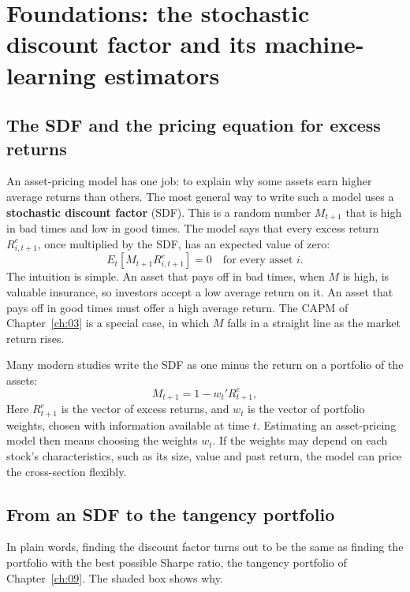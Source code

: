 \section{Foundations: the stochastic discount factor and its machine-learning estimators}
\label{sec:22-foundations}

\subsection{The SDF and the pricing equation for excess returns}

An asset-pricing model has one job: to explain why some assets earn higher average returns than others. The most general way to write such a model uses a \textbf{stochastic discount factor} (SDF). This is a random number $M_{t+1}$ that is high in bad times and low in good times. The model says that every excess return $R^e_{i,t+1}$, once multiplied by the SDF, has an expected value of zero:
\begin{equation}
  E_t\!\left[ M_{t+1} R^e_{i,t+1} \right] = 0 \quad \text{for every asset } i.
  \label{eq:22-pricing}
\end{equation}
The intuition is simple. An asset that pays off in bad times, when $M$ is high, is valuable insurance, so investors accept a low average return on it. An asset that pays off in good times must offer a high average return. The CAPM of Chapter~\ref{ch:03} is a special case, in which $M$ falls in a straight line as the market return rises.

Many modern studies write the SDF as one minus the return on a portfolio of the assets:
\begin{equation}
  M_{t+1} = 1 - w_t' R^e_{t+1},
  \label{eq:22-sdf}
\end{equation}
Here $R^e_{t+1}$ is the vector of excess returns, and $w_t$ is the vector of portfolio weights, chosen with information available at time $t$. Estimating an asset-pricing model then means choosing the weights $w_t$. If the weights may depend on each stock's characteristics, such as its size, value and past return, the model can price the cross-section flexibly.

\subsection{From an SDF to the tangency portfolio}

In plain words, finding the discount factor turns out to be the same as finding the portfolio with the best possible Sharpe ratio, the tangency portfolio of Chapter~\ref{ch:09}. The shaded box shows why.

